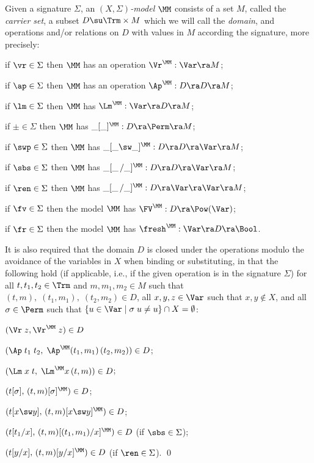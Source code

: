 \medskip 
\begin{defi} \rm  \label{defi-model-extended}
Given a signature $\Sigma$, an \emph{$(X,\Sigma)$-model} $\MM$ consists of a set $M$, called the \emph{carrier set}, 
a subset $D \su \Trm \times M$ which we will call the \emph{domain}, 
and operations and/or relations on $D$ with values in $M$ according  the signature, more precisely: 
%
\begin{mmyitem}
	\item 
	if $\vr \in \Sigma$ 
	then $\MM$ has an operation $\Vr^\MM : \Var \ra M$; 
	\item if $\ap \in \Sigma$ 
	then $\MM$ has an operation  $\Ap^\MM : D \ra D \ra M$; 
	\item if $\lm \in \Sigma$ 
	then $\MM$ has %
	$\Lm^\MM : \Var \ra D \ra M$; 
	\item 
	if $\pm \in \Sigma$ 
	then $\MM$ has %
	$\_[\_]^\MM : D \ra \Perm \ra M$; 
	\item 
	if $\swp \in \Sigma$  
	then $\MM$ has %
	$\_[\_\sw \_]^\MM : D \ra D \ra \Var \ra M$; 
	\item 
	if $\sbs \in \Sigma$ 
	then $\MM$ has %
	$\_[\_ \,/ \_]^\MM : D \ra D \ra \Var \ra M$; 
	\item 
	if $\ren \in \Sigma$ 
	then $\MM$ has %
	$\_[\_ \,/ \_]^\MM : D \ra \Var \ra \Var \ra M$; 
	\item 
	if $\fv \in \Sigma$ 
	then the model $\MM$ has %
	$\FV^\MM : D \ra \Pow(\Var)$; 
	\item 
	if $\fr \in \Sigma$ 
	then the model $\MM$ has %
	$\fresh^\MM : \Var \ra D \ra \Bool$.  
\end{mmyitem} 
%

It is also required that the domain $D$ is closed under the operations modulo the avoidance of the variables in $X$ when binding or substituting, in that the following hold (if applicable, i.e., if the given operation is in the signature $\Sigma$) for all $t,t_1,t_2\in  \Trm$ and 
$m,m_1,m_2\in  M$ such that $(t,m),\;(t_1,m_1),\;(t_2,m_2) \in D$, all $x,y,z \in \Var$ such that 
$x,y \notin X$, 
and all $\sigma\in\Perm$ such that $\{u \in \Var \mid \sigma\;u \not= u\} \cap X = \emptyset$: 
%
\begin{mmyitem} 
	\item $(\Vr\;z,\Vr^\MM\;z) \in D$
\item $(\Ap\;t_1\;t_2,\;\Ap^\MM(t_1,m_1)\,(t_2,m_2)) \in D$; 
\item $(\Lm\;x\;t,\;\Lm^\MM x\,(t,m)) \in D$; 
\item  $(t[\sigma],\,(t,m)[\sigma]^\MM ) \in D$; 
\item  $(t[x \sw y],\,(t,m)[x \sw y]^\MM ) \in D$; 
\item  $(t[t_1 / x],\,(t,m)[(t_1,m_1) / x]^\MM ) \in D$ 
(if $\sbs \in \Sigma$); 
\item $(t[y / x],\,(t,m)[y / x]^\MM ) \in D$ 
(if $\ren \in \Sigma$).    \qed 
\end{mmyitem}
%
\end{defi} 
\medskip 

